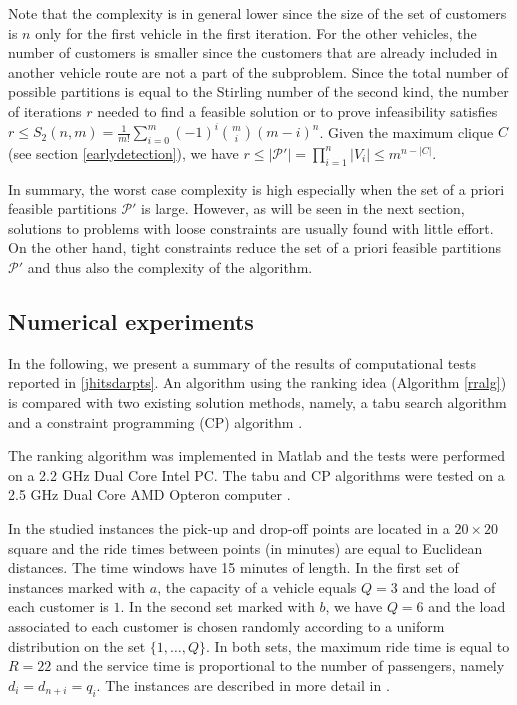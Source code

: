 \documentclass[dissertation,draft*]{aaltoseries}
\begin{document}
Note that the complexity is in general lower since the size of the set of customers is
$n$ only for the first vehicle in the first iteration. For the other vehicles, the number of customers is
smaller since the customers that are already included in another vehicle route
are not a part of the subproblem. 
Since the total number of possible partitions is 
equal to the Stirling number of the second kind, the number of iterations $r$ needed to find a feasible solution
or to prove infeasibility satisfies $r \leq S_2(n,m) = \frac {1}{m!} \sum_{i=0}^{m} (-1)^i {m \choose i} (m-i)^n$.
Given the maximum clique $C$ (see section \ref{earlydetection}), we have $r \leq |\mathcal{P}'| = \prod_{i=1}^n |V_i| \leq m^{n-|C|}$.

In summary, the worst case complexity is high especially when the set of a priori feasible partitions $\mathcal{P}'$ is large. 
However, as will be seen in the next section, solutions to problems with loose constraints are usually found with little effort. 
On the other hand, tight constraints reduce the set of a priori feasible partitions $\mathcal{P}'$ 
and thus also the complexity of the algorithm.




\subsection{Numerical experiments}
\label{mvexperience}
In the following, we present a summary of the results of computational tests reported in \ref{jhitsdarpts}.
An algorithm using the ranking idea (Algorithm \ref{rralg}) is compared with two existing solution methods,
namely, a tabu search algorithm \citep{cordeau02} and
a constraint programming (CP) algorithm \citep{berbegliafeas}. 

The ranking algorithm was implemented in Matlab and the tests were performed on a 2.2 GHz Dual Core Intel PC. 
The tabu and CP algorithms were tested on a 2.5 GHz Dual Core AMD Opteron computer \citep{berbegliathesis}. 

In the studied instances the pick-up and drop-off points are located in a $20 \times 20$ square and the 
ride times between points (in minutes) are equal to Euclidean distances. The time windows
have 15 minutes of length. In the first set of instances marked with $a$, the capacity of a vehicle equals $Q=3$ and 
the load of each customer is $1$. In the 
second set marked with $b$, we have $Q=6$ and the load associated to each customer
is chosen randomly according to a uniform distribution on the set $\{1, \ldots,Q\}$.
In both sets, the maximum ride time is equal to $R=22$ and the service time is 
proportional to the number of passengers, namely $d_i = d_{n+i} = q_i$.
The instances are described in more detail in \citep{cordeau01,ropke2007,berbegliafeas}.
\end{document}
